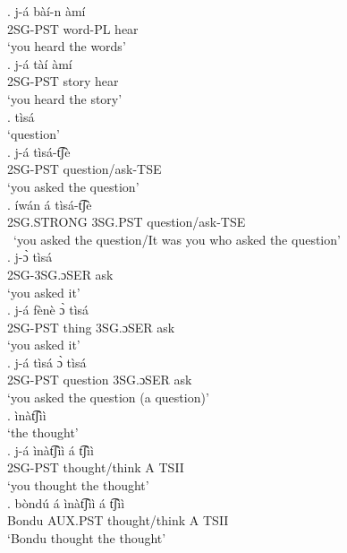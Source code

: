 \documentclass{assets/fieldnotes}
\begin{document}
{\exg. j-á bàí-n àmí\\
2SG-PST word-PL hear\\
`you heard the words' \\

\exg. j-á tàí àmí\\
2SG-PST story hear\\
`you heard the story' \\

\exg. tìsá\\
`question' \\

\exg. j-á tìsá-t͡ʃè\\
2SG-PST question/ask-TSE\\
`you asked the question' \\

\exg. íwán á tìsá-t͡ʃè\\
2SG.STRONG 3SG.PST question/ask-TSE\\\
`you asked the question/It was you who asked the question' \\

\exg. j-ɔ̀ tìsá\\
2SG-3SG.ɔSER ask\\
`you asked it' \\

\exg. j-á fènè ɔ̀ tìsá\\
2SG-PST thing 3SG.ɔSER ask\\
`you asked it' \\

\exg. j-á tìsá ɔ̀ tìsá\\
2SG-PST question 3SG.ɔSER ask\\
`you asked the question (a question)' \\


\exg. ìnàt͡ʃìì\\
`the thought' \\

\exg. j-á ìnàt͡ʃìì á t͡ʃìì\\
2SG-PST thought/think A TSII\\
`you thought the thought' \\

\exg. bòndú á ìnàt͡ʃìì á t͡ʃìì\\
Bondu AUX.PST thought/think A TSII\\
`Bondu thought the thought' \\


}
\end{document}
